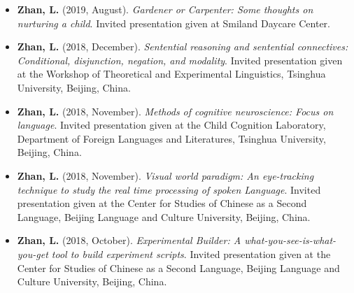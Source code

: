 \documentclass[
  12pt,
]{article}
\begin{document}
\begin{itemize}
\item
  \textbf{Zhan, L.} (2019, August). \emph{Gardener or Carpenter: Some
  thoughts on nurturing a child}. Invited presentation given at Smiland
  Daycare Center. \href{https://publications.likan.info/talks/parent/}{
  \footnotesize \faExternalLink* }
\item
  \textbf{Zhan, L.} (2018, December). \emph{Sentential reasoning and
  sentential connectives: Conditional, disjunction, negation, and
  modality}. Invited presentation given at the Workshop of Theoretical
  and Experimental Linguistics, Tsinghua University, Beijing, China.
  \href{https://publications.likan.info/Talks/Sentential_Reasoning_Sentential_Connectives.pdf}{
  \faFilePdf[regular] }
\item
  \textbf{Zhan, L.} (2018, November). \emph{Methods of cognitive
  neuroscience: Focus on language}. Invited presentation given at the
  Child Cognition Laboratory, Department of Foreign Languages and
  Literatures, Tsinghua University, Beijing, China.
  \href{https://publications.likan.info/Talks/MethodsCognNeurosciLang2018NOV.pdf}{
  \faFilePdf[regular] }
\item
  \textbf{Zhan, L.} (2018, November). \emph{Visual world paradigm: An
  eye-tracking technique to study the real time processing of spoken
  Language}. Invited presentation given at the Center for Studies of
  Chinese as a Second Language, Beijing Language and Culture University,
  Beijing, China.
  \href{https://publications.likan.info/Talks/Visual_World_Paradigm.pdf}{
  \faFilePdf[regular] }
\item
  \textbf{Zhan, L.} (2018, October). \emph{Experimental Builder: A
  what-you-see-is-what-you-get tool to build experiment scripts}.
  Invited presentation given at the Center for Studies of Chinese as a
  Second Language, Beijing Language and Culture University, Beijing,
  China.
  \href{https://publications.likan.info/Eyelink_Experiment_Builder_Training_Materials/}{
  \faFilePdf[regular] }
\end{itemize}
\end{document}
